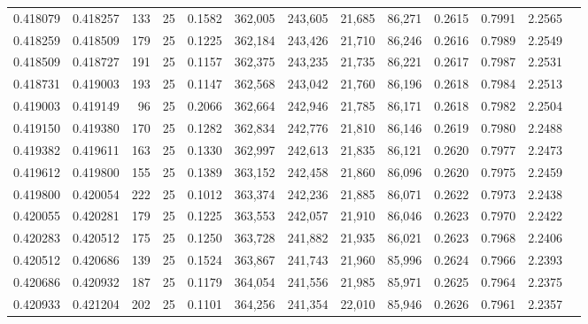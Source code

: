 \begin{tabular}{rrrrrrrrrrrrr}
0.418079 & 0.418257 &   133 &  25 &                                     0.1582 & 362,005 & 243,605 &  21,685 &  86,271 & 0.2615 & 0.7991 & 2.2565 \\
0.418259 & 0.418509 &   179 &  25 &                                     0.1225 & 362,184 & 243,426 &  21,710 &  86,246 & 0.2616 & 0.7989 & 2.2549 \\
0.418509 & 0.418727 &   191 &  25 &                                     0.1157 & 362,375 & 243,235 &  21,735 &  86,221 & 0.2617 & 0.7987 & 2.2531 \\
0.418731 & 0.419003 &   193 &  25 &                                     0.1147 & 362,568 & 243,042 &  21,760 &  86,196 & 0.2618 & 0.7984 & 2.2513 \\
0.419003 & 0.419149 &    96 &  25 &                                     0.2066 & 362,664 & 242,946 &  21,785 &  86,171 & 0.2618 & 0.7982 & 2.2504 \\
0.419150 & 0.419380 &   170 &  25 &                                     0.1282 & 362,834 & 242,776 &  21,810 &  86,146 & 0.2619 & 0.7980 & 2.2488 \\
0.419382 & 0.419611 &   163 &  25 &                                     0.1330 & 362,997 & 242,613 &  21,835 &  86,121 & 0.2620 & 0.7977 & 2.2473 \\
0.419612 & 0.419800 &   155 &  25 &                                     0.1389 & 363,152 & 242,458 &  21,860 &  86,096 & 0.2620 & 0.7975 & 2.2459 \\
0.419800 & 0.420054 &   222 &  25 &                                     0.1012 & 363,374 & 242,236 &  21,885 &  86,071 & 0.2622 & 0.7973 & 2.2438 \\
0.420055 & 0.420281 &   179 &  25 &                                     0.1225 & 363,553 & 242,057 &  21,910 &  86,046 & 0.2623 & 0.7970 & 2.2422 \\
0.420283 & 0.420512 &   175 &  25 &                                     0.1250 & 363,728 & 241,882 &  21,935 &  86,021 & 0.2623 & 0.7968 & 2.2406 \\
0.420512 & 0.420686 &   139 &  25 &                                     0.1524 & 363,867 & 241,743 &  21,960 &  85,996 & 0.2624 & 0.7966 & 2.2393 \\
0.420686 & 0.420932 &   187 &  25 &                                     0.1179 & 364,054 & 241,556 &  21,985 &  85,971 & 0.2625 & 0.7964 & 2.2375 \\
0.420933 & 0.421204 &   202 &  25 &                                     0.1101 & 364,256 & 241,354 &  22,010 &  85,946 & 0.2626 & 0.7961 & 2.2357 \\

\end{tabular}
